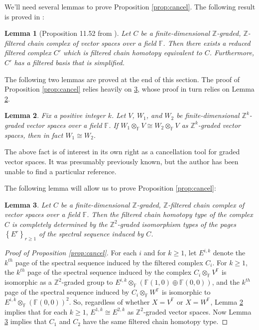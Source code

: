 \documentclass[11pt]{article}
\theoremstyle{plain} \newtheorem{thm}{Theorem}[subsection]
\theoremstyle{plain} \newtheorem{cor}[thm]{Corollary}
\theoremstyle{plain} \newtheorem{prop}[thm]{Proposition}
\theoremstyle{plain} \newtheorem{conj}[thm]{Conjecture}
\theoremstyle{plain} \newtheorem{lem}[thm]{Lemma}
\theoremstyle{definition} \newtheorem{df}[thm]{Definition}
\theoremstyle{remark} \newtheorem{rmk}[thm]{Remark}
\theoremstyle{remark} \newtheorem{obs}[thm]{Observation}
\numberwithin{equation}{section}
\begin{document}
We'll need several lemmas to prove Proposition \ref{prop:cancel}.  The following result is proved in \cite{lot}:

\begin{lem}[Proposition 11.52 from \cite{lot}]\label{lem:reduced}
Let $C$ be a finite-dimensional $\mathbb{Z}$-graded, $\mathbb{Z}$-filtered chain complex of vector spaces over a field $\mathbb{F}$.  Then there exists a reduced  filtered complex $C'$ which is filtered chain homotopy equivalent to $C$.  Furthermore, $C'$ has a filtered basis that is simplified.
\end{lem}

The following two lemmas are proved at the end of this section.  The proof of Proposition \ref{prop:cancel} relies heavily on \ref{lem:ss}, whose proof in turn relies on Lemma \ref{lem:cancel}.

\begin{lem}\label{lem:cancel}
Fix a positive integer $k$.  Let $V$, $W_1$, and $W_2$ be finite-dimensional $\mathbb{Z}^k$-graded vector spaces over a field $\mathbb{F}$.
If $W_1 \otimes_{\mathbb{F}} V \cong W_2 \otimes_{\mathbb{F}} V$ as $\mathbb{Z}^k$-graded vector spaces, then in fact $W_1 \cong W_2$.
\end{lem}

The above fact is of interest in its own right as a cancellation tool for graded vector spaces.  It was presumably previously known, but the author has been unable to find a particular reference.

The following lemma will allow us to prove Proposition \ref{prop:cancel}:

\begin{lem}\label{lem:ss}
Let $C$ be a finite-dimensional $\mathbb{Z}$-graded, $\mathbb{Z}$-filtered chain complex of vector spaces over a field $\mathbb{F}$.  Then the filtered chain homotopy type of the complex $C$ is completely determined by the $\mathbb{Z}^2$-graded isomorphism types of the pages $\left\{ E^r \right\}_{r \geq 1}$ of the spectral sequence induced by $C$.
\end{lem}

\begin{proof}[Proof of Proposition \ref{prop:cancel}]
For each $i$ and for $k \geq 1$, let $E^{i, k}$ denote the $k^{th}$ page of the spectral sequence induced by the filtered complex $C_i$.
For $k \geq 1$, the $k^{th}$ page of the spectral sequence induced by the complex $C_i \otimes_{\mathbb{F}} V^{\mathbb{F}}$ is isomorphic as a $\mathbb{Z}^2$-graded group to $E^{i, k} \otimes_{\mathbb{F}} \left( \mathbb{F}(1,0) \oplus \mathbb{F}(0,0) \right)$, and the $k^{th}$ page of the spectral sequence induced by $C_i \otimes_{\mathbb{F}} W^{\mathbb{F}}$ is isomorphic to $E^{i, k} \otimes_{\mathbb{F}} \left( \mathbb{F}(0,0)\right)^2$.  So, regardless of whether $X = V^{\mathbb{F}}$ or $X = W^{\mathbb{F}}$, Lemma \ref{lem:cancel} implies that for each $k \geq 1$, $E^{1,k} \cong E^{2,k}$ as $\mathbb{Z}^2$-graded vector spaces.  Now Lemma \ref{lem:ss} implies that $C_1$ and $C_2$ have the same filtered chain homotopy type. 
\end{proof}
\end{document}

